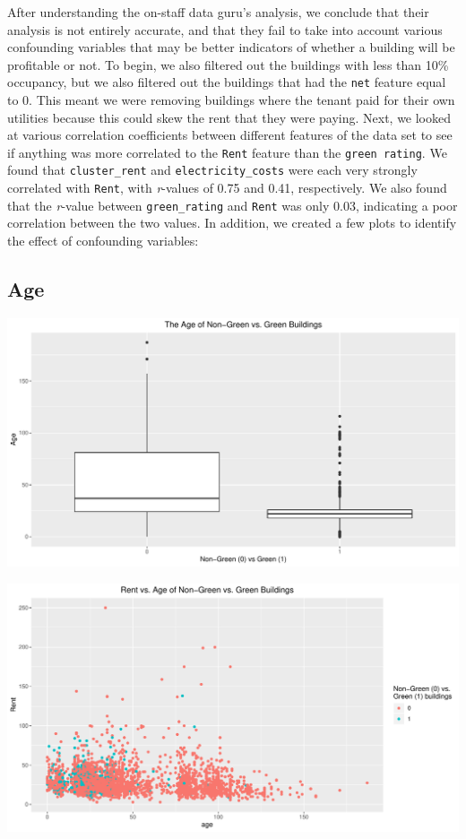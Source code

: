 \documentclass[]{article}
\begin{document}
After understanding the on-staff data guru's analysis, we conclude that
their analysis is not entirely accurate, and that they fail to take into
account various confounding variables that may be better indicators of
whether a building will be profitable or not. To begin, we also filtered
out the buildings with less than 10\% occupancy, but we also filtered
out the buildings that had the \texttt{net} feature equal to 0. This
meant we were removing buildings where the tenant paid for their own
utilities because this could skew the rent that they were paying. Next,
we looked at various correlation coefficients between different features
of the data set to see if anything was more correlated to the
\texttt{Rent} feature than the \texttt{green\ rating}. We found that
\texttt{cluster\_rent} and \texttt{electricity\_costs} were each very
strongly correlated with \texttt{Rent}, with \emph{r}-values of 0.75 and
0.41, respectively. We also found that the \emph{r}-value between
\texttt{green\_rating} and \texttt{Rent} was only 0.03, indicating a
poor correlation between the two values. In addition, we created a few
plots to identify the effect of confounding variables:

\hypertarget{age}{%
\subsection{Age}\label{age}}

\includegraphics{Report_files/figure-latex/age_box-1.pdf}

\includegraphics{Report_files/figure-latex/age_scatter-1.pdf}
\end{document}
